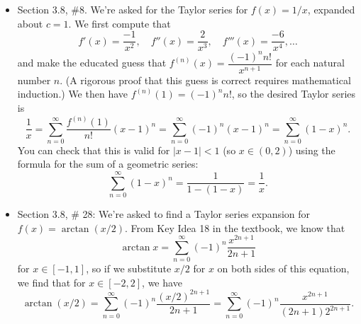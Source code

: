 \documentclass[12pt]{article}
\newcommand{\abs}[1]{\left\lvert #1\right\rvert}
\begin{document}
\begin{itemize}
\item Section 3.8, \#8. We're asked for the Taylor series for $f(x)=1/x$, expanded about $c=1$. We first compute that
\[
 f'(x) = \frac{-1}{x^2}, \quad f''(x) = \frac{2}{x^3}, \quad f'''(x) = \frac{-6}{x^4}, \ldots
\]
and make the educated guess that $f^{(n)}(x) = \dfrac{(-1)^nn!}{x^{n+1}}$ for each natural number $n$. (A rigorous proof that this guess is correct requires mathematical induction.) We then have $f^{(n)}(1) = (-1)^nn!$, so the desired Taylor series is
\[
 \frac{1}{x} = \sum_{n=0}^\infty \frac{f^{(n)}(1)}{n!}(x-1)^n = \sum_{n=0}^\infty (-1)^n(x-1)^n = \sum_{n=0}^\infty (1-x)^n.
\]
You can check that this is valid for $\abs{x-1}<1$ (so $x\in (0,2)$) using the formula for the sum of a geometric series:
\[
 \sum_{n=0}^\infty (1-x)^n = \frac{1}{1-(1-x)} = \frac{1}{x}.
\]

\item Section 3.8, \# 28: We're asked to find a Taylor series expansion for $f(x) = \arctan(x/2)$. From Key Idea 18 in the textbook, we know that
\[
 \arctan x = \sum_{n=0}^\infty (-1)^n\frac{x^{2n+1}}{2n+1}
\]
for $x\in [-1,1]$, so if we substitute $x/2$ for $x$ on both sides of this equation, we find that for $x\in [-2,2]$, we have
\[
 \arctan(x/2) = \sum_{n=0}^\infty (-1)^n\frac{(x/2)^{2n+1}}{2n+1} = \sum_{n=0}^\infty (-1)^n\frac{x^{2n+1}}{(2n+1)2^{2n+1}}.
\]

\end{itemize}
\end{document}
